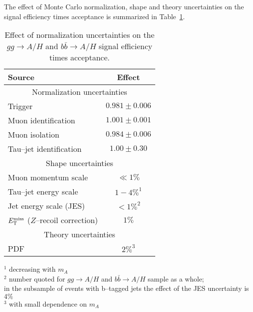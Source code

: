 The effect of Monte Carlo normalization, shape and theory uncertainties on the
signal efficiency times acceptance is summarized in
Table~\ref{tab:ExpUncertainties}.

\begin{table}[t]
\begin{center}
\tablesize
\begin{tabular}{|l|c|}
\hline
Source & Effect \\
\hline
\hline
\multicolumn{2}{|c|}{Normalization uncertainties} \\
\hline
Trigger                         & $0.981 \pm 0.006$ \\
Muon identification             & $1.001 \pm 0.001$ \\
Muon isolation                  & $0.984 \pm 0.006$ \\
Tau--jet identification         & $1.00  \pm 0.30$ \\
\hline
\hline
\multicolumn{2}{|c|}{Shape uncertainties} \\
\hline
Muon momentum scale             & $\ll 1\%$ \\
Tau--jet energy scale           & $1 - 4\%^{1}$ \\
Jet energy scale (JES)          & $< 1\%^{2}$ \\
$E_{\mathrm{T}}^{\text{miss}}$ ($Z$--recoil correction) & $1\%$ \\
\hline
\hline
\multicolumn{2}{|c|}{Theory uncertainties} \\
\hline
PDF & $2\%^{3}$ \\
\hline
\end{tabular}
\end{center}
$^{1}$ decreasing with $m_{A}$ \\
$^{2}$ number quoted for $gg \to A/H$ and $b\bar{b} \to A/H$ sample as a whole; \\
\hspace{5mm} in the subsample of events with b--tagged jets the effect of the JES uncertainty is $4\%$ \\
$^{3}$ with small dependence on $m_{A}$ \\
\begin{center}
\caption[Effect of normalization uncertainties on signal efficiency times
acceptance]{\captiontext Effect of normalization uncertainties on the $gg \to
A/H$ and $b\bar{b} \to A/H$ signal efficiency times acceptance.}
\label{tab:ExpUncertainties}
\end{center}
\end{table}
%
